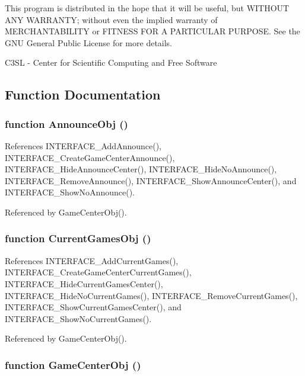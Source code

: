 This program is distributed in the hope that it will be useful, but WITHOUT ANY WARRANTY; without even the implied warranty of MERCHANTABILITY or FITNESS FOR A PARTICULAR PURPOSE. See the GNU General Public License for more details.

C3SL - Center for Scientific Computing and Free Software 

\subsection{Function Documentation}
\subsubsection[AnnounceObj]{\setlength{\rightskip}{0pt plus 5cm}function AnnounceObj ()}\label{interface_2gamecenter_8js_0eb1eefa16f53a3ec226f2e03a4d5b62}




References INTERFACE\_\-AddAnnounce(), INTERFACE\_\-CreateGameCenterAnnounce(), INTERFACE\_\-HideAnnounceCenter(), INTERFACE\_\-HideNoAnnounce(), INTERFACE\_\-RemoveAnnounce(), INTERFACE\_\-ShowAnnounceCenter(), and INTERFACE\_\-ShowNoAnnounce().

Referenced by GameCenterObj().
\subsubsection[CurrentGamesObj]{\setlength{\rightskip}{0pt plus 5cm}function CurrentGamesObj ()}\label{interface_2gamecenter_8js_f07b82cf97a45480f7867b745050be32}




References INTERFACE\_\-AddCurrentGames(), INTERFACE\_\-CreateGameCenterCurrentGames(), INTERFACE\_\-HideCurrentGamesCenter(), INTERFACE\_\-HideNoCurrentGames(), INTERFACE\_\-RemoveCurrentGames(), INTERFACE\_\-ShowCurrentGamesCenter(), and INTERFACE\_\-ShowNoCurrentGames().

Referenced by GameCenterObj().
\subsubsection[GameCenterObj]{\setlength{\rightskip}{0pt plus 5cm}function GameCenterObj ()}\label{interface_2gamecenter_8js_abb9e01b8520f35e37e546cda42752fb}




